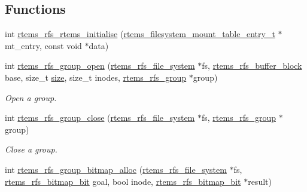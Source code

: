 \subsection*{Functions}
\begin{DoxyCompactItemize}
\item 
int \mbox{\hyperlink{group__rtems__rfs_gaf07230e2a00d753c32235965ba8ca4ad}{rtems\+\_\+rfs\+\_\+rtems\+\_\+initialise}} (\mbox{\hyperlink{structrtems__filesystem__mount__table__entry__tt}{rtems\+\_\+filesystem\+\_\+mount\+\_\+table\+\_\+entry\+\_\+t}} $\ast$mt\+\_\+entry, const void $\ast$data)
\end{DoxyCompactItemize}
\begin{DoxyCompactItemize}
\item 
int \mbox{\hyperlink{group__rtems__rfs_gac8ab81ba00e5100d7f755ff951b28a83}{rtems\+\_\+rfs\+\_\+group\+\_\+open}} (\mbox{\hyperlink{struct__rtems__rfs__file__system}{rtems\+\_\+rfs\+\_\+file\+\_\+system}} $\ast$fs, \mbox{\hyperlink{rtems-rfs-buffer_8h_a5650d53328a5af0a78198fe780aec043}{rtems\+\_\+rfs\+\_\+buffer\+\_\+block}} base, size\+\_\+t \mbox{\hyperlink{sun4u_2tte_8h_a245260f6f74972558f61b85227df5aae}{size}}, size\+\_\+t inodes, \mbox{\hyperlink{group__rtems__rfs_ga0e7b27c60e21039ef07a8c843fa8a3e5}{rtems\+\_\+rfs\+\_\+group}} $\ast$group)
\begin{DoxyCompactList}\small\item\em Open a group. \end{DoxyCompactList}\item 
int \mbox{\hyperlink{group__rtems__rfs_ga5f2a47d06d6a8209b182348b7b38f91d}{rtems\+\_\+rfs\+\_\+group\+\_\+close}} (\mbox{\hyperlink{struct__rtems__rfs__file__system}{rtems\+\_\+rfs\+\_\+file\+\_\+system}} $\ast$fs, \mbox{\hyperlink{group__rtems__rfs_ga0e7b27c60e21039ef07a8c843fa8a3e5}{rtems\+\_\+rfs\+\_\+group}} $\ast$group)
\begin{DoxyCompactList}\small\item\em Close a group. \end{DoxyCompactList}\item 
int \mbox{\hyperlink{group__rtems__rfs_ga41c38f1d939cf04cad27dde05f52c394}{rtems\+\_\+rfs\+\_\+group\+\_\+bitmap\+\_\+alloc}} (\mbox{\hyperlink{struct__rtems__rfs__file__system}{rtems\+\_\+rfs\+\_\+file\+\_\+system}} $\ast$fs, \mbox{\hyperlink{rtems-rfs-bitmaps_8h_acc1b0aefe1b090890ccbc1b05279a78e}{rtems\+\_\+rfs\+\_\+bitmap\+\_\+bit}} goal, bool inode, \mbox{\hyperlink{rtems-rfs-bitmaps_8h_acc1b0aefe1b090890ccbc1b05279a78e}{rtems\+\_\+rfs\+\_\+bitmap\+\_\+bit}} $\ast$result)

\end{DoxyCompactItemize}
